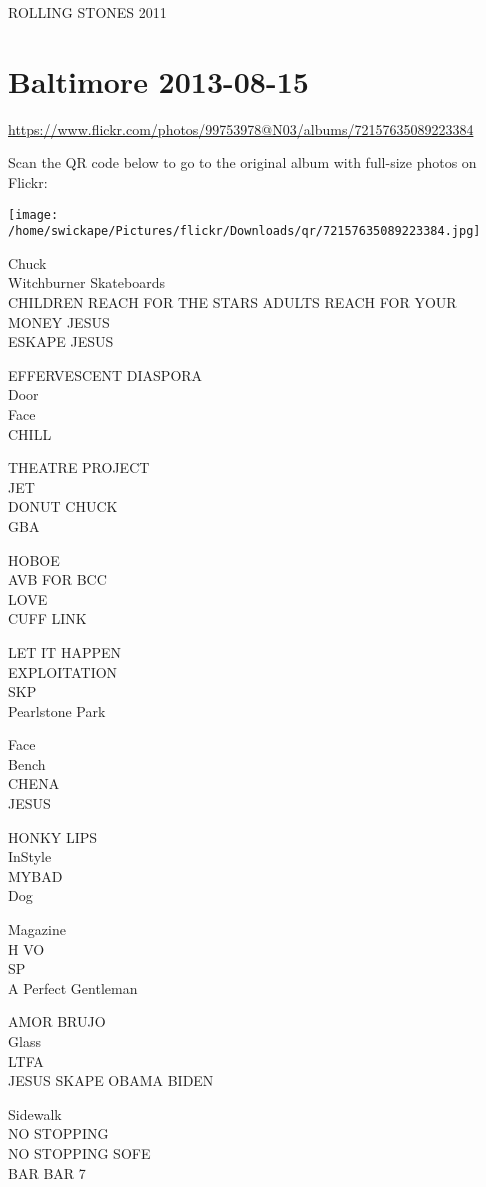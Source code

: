 \documentclass[10pt,letterpaper]{article}
\begin{document}
ROLLING STONES 2011


\section*{Baltimore 2013-08-15}

\url{https://www.flickr.com/photos/99753978@N03/albums/72157635089223384}

Scan the QR code below to go to the original album with full-size photos on Flickr:

\texttt{[image: /home/swickape/Pictures/flickr/Downloads/qr/72157635089223384.jpg]}


Chuck\\
Witchburner Skateboards\\
CHILDREN REACH FOR THE STARS ADULTS REACH FOR YOUR MONEY JESUS\\
ESKAPE JESUS

EFFERVESCENT DIASPORA\\
Door\\
Face\\
CHILL

THEATRE PROJECT\\
JET\\
DONUT CHUCK\\
GBA

HOBOE\\
AVB FOR BCC\\
LOVE\\
CUFF LINK

LET IT HAPPEN\\
EXPLOITATION\\
SKP\\
Pearlstone Park

Face\\
Bench\\
CHENA\\
JESUS

HONKY LIPS\\
InStyle\\
MYBAD\\
Dog

Magazine\\
H VO\\
SP\\
A Perfect Gentleman

AMOR BRUJO\\
Glass\\
LTFA\\
JESUS SKAPE OBAMA BIDEN

Sidewalk\\
NO STOPPING\\
NO STOPPING SOFE\\
BAR BAR 7
\end{document}
